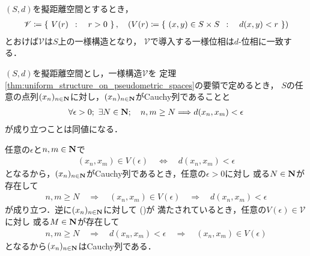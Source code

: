 	\begin{screen}
		\begin{thm}[擬距離空間の一様構造]
		\label{thm:uniform_structure_on_pseudometric_spaces}
			$(S,d)$を擬距離空間とするとき，
			\begin{align}
				\mathscr{V} \coloneqq
				\left\{\ V(r)\ \, : \quad r > 0\ \right\},
				\quad (V(r) \coloneqq \left\{\ (x,y) \in S \times S\ \, : \quad d(x,y) < r\ \right\})
			\end{align}
			とおけば$\mathscr{V}$は$S$上の一様構造となり，
			$\mathscr{V}$で導入する一様位相は$d$-位相に一致する．
		\end{thm}
	\end{screen}
	
	\begin{screen}
		\begin{thm}[擬距離空間のCauchy列]
		\label{thm:Cauchy_sequences_on_pseudometric_spaces}
			$(S,d)$を擬距離空間とし，一様構造$\mathscr{V}$を
			定理\ref{thm:uniform_structure_on_pseudometric_spaces}の要領で定めるとき，
			$S$の任意の点列$(x_n)_{n \in \mathbf{N}}$に対し，$(x_n)_{n \in \mathbf{N}}$がCauchy列であることと
			\begin{align}
				\forall \epsilon > 0;\ 
				\exists N \in \N;\quad
				n,m \geq N \Longrightarrow d(x_n,x_m) < \epsilon
				\label{eq:thm_Cauchy_sequences_on_pseudometric_spaces}
			\end{align}
			が成り立つことは同値になる．
		\end{thm}
	\end{screen}
	
	\begin{prf}
		任意の$\epsilon$と$n,m \in \mathbf{N}$で
		\begin{align}
			(x_n,x_m) \in V(\epsilon) \quad \Longleftrightarrow \quad
			d(x_n,x_m) < \epsilon
		\end{align}
		となるから，$(x_n)_{n \in \mathbf{N}}$がCauchy列であるとき，任意の$\epsilon > 0$に対し
		或る$N \in \mathbf{N}$が存在して
		\begin{align}
			n,m \geq N \quad \Longrightarrow \quad
			(x_n,x_m) \in V(\epsilon) \quad \Longrightarrow \quad
			d(x_n,x_m) < \epsilon
		\end{align}
		が成り立つ．逆に$(x_n)_{n \in \mathbf{N}}$に対して
		()が
		満たされているとき，任意の$V(\epsilon) \in \mathscr{V}$に対し
		或る$M \in \mathbf{N}$が存在して
		\begin{align}
			n,m \geq N \quad \Longrightarrow \quad
			d(x_n,x_m) < \epsilon \quad \Longrightarrow \quad
			(x_n,x_m) \in V(\epsilon)
		\end{align}
		となるから$(x_n)_{n \in \mathbf{N}}$はCauchy列である．
		\QED
	\end{prf}
	
